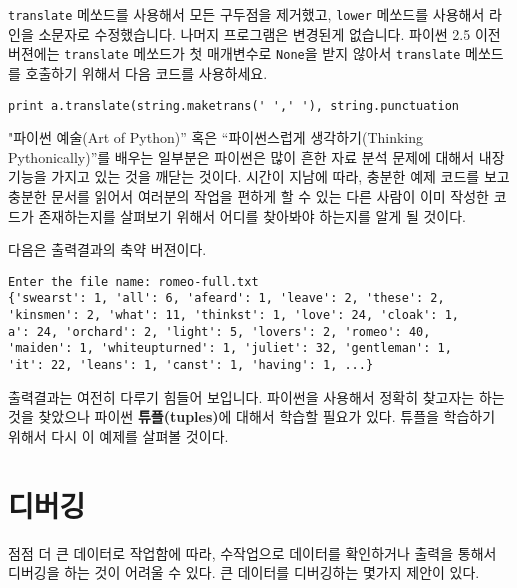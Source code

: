 {\tt translate} 메쏘드를 사용해서 모든 구두점을 제거했고, {\tt lower} 메쏘드를 사용해서 라인을 소문자로 수정했습니다.
나머지 프로그램은 변경된게 없습니다. 파이썬 2.5 이전 버젼에는 {\tt translate} 메쏘드가 첫 매개변수로 {\tt None}을 받지 않아서
{\tt translate} 메쏘드를 호출하기 위해서 다음 코드를 사용하세요.

\beforeverb
\begin{verbatim}
print a.translate(string.maketrans(' ',' '), string.punctuation
\end{verbatim}
\afterverb
%

"파이썬 예술(Art of Python)'' 혹은 ``파이썬스럽게 생각하기(Thinking Pythonically)''를 배우는 일부분은
파이썬은 많이 흔한 자료 분석 문제에 대해서 내장 기능을 가지고 있는 것을 깨닫는 것이다.
시간이 지남에 따라, 충분한 예제 코드를 보고 충분한 문서를 읽어서 여러분의 작업을 편하게 할 수 있는 다른 사람이 이미 작성한 코드가 존재하는지를 살펴보기 위해서
어디를 찾아봐야 하는지를 알게 될 것이다.

다음은 출력결과의 축약 버젼이다.

\beforeverb
\begin{verbatim}
Enter the file name: romeo-full.txt
{'swearst': 1, 'all': 6, 'afeard': 1, 'leave': 2, 'these': 2, 
'kinsmen': 2, 'what': 11, 'thinkst': 1, 'love': 24, 'cloak': 1, 
a': 24, 'orchard': 2, 'light': 5, 'lovers': 2, 'romeo': 40, 
'maiden': 1, 'whiteupturned': 1, 'juliet': 32, 'gentleman': 1, 
'it': 22, 'leans': 1, 'canst': 1, 'having': 1, ...}
\end{verbatim}
\afterverb
%

출력결과는 여전히 다루기 힘들어 보입니다. 파이썬을 사용해서 정확히 찾고자는 하는 것을 찾았으나 파이썬 {\bf 튜플(tuples)}에 대해서 학습할 필요가 있다.
튜플을 학습하기 위해서 다시 이 예제를 살펴볼 것이다.


\section{디버깅}

점점 더 큰 데이터로 작업함에 따라, 수작업으로 데이터를 확인하거나 출력을 통해서 디버깅을 하는 것이 어려울 수 있다.
큰 데이터를 디버깅하는 몇가지 제안이 있다.

